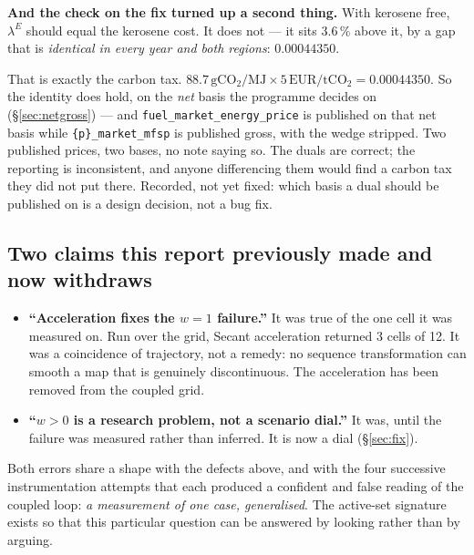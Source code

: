 \documentclass[11pt,a4paper]{article}
\newcommand{\var}[1]{\texttt{\small #1}}
\begin{document}
\begin{keybox}
\textbf{And the check on the fix turned up a second thing.} With kerosene free,
$\lambda^{E}$ should equal the kerosene cost. It does not --- it sits $3.6\,\%$ above it,
by a gap that is \emph{identical in every year and both regions}: $0.00044350$.

That is exactly the carbon tax. $88.7\,\mathrm{gCO_2/MJ} \times 5\,\mathrm{EUR/tCO_2} =
0.00044350$. So the identity does hold, on the \emph{net} basis the programme decides on
(\S\ref{sec:netgross}) --- and \var{fuel\_market\_energy\_price} is published on that net
basis while \var{\{p\}\_market\_mfsp} is published gross, with the wedge stripped. Two
published prices, two bases, no note saying so. The duals are correct; the reporting is
inconsistent, and anyone differencing them would find a carbon tax they did not put
there. Recorded, not yet fixed: which basis a dual should be published on is a design
decision, not a bug fix.
\end{keybox}

\subsection*{Two claims this report previously made and now withdraws}

\begin{itemize}[leftmargin=*]
  \item \textbf{``Acceleration fixes the \(w=1\) failure.''} It was true of the one cell
        it was measured on. Run over the grid, Secant acceleration returned 3 cells of
        12. It was a coincidence of trajectory, not a remedy: no sequence transformation
        can smooth a map that is genuinely discontinuous. The acceleration has been
        removed from the coupled grid.
  \item \textbf{``\(w>0\) is a research problem, not a scenario dial.''} It was, until
        the failure was measured rather than inferred. It is now a dial
        (\S\ref{sec:fix}).
\end{itemize}

\noindent Both errors share a shape with the defects above, and with the four successive
instrumentation attempts that each produced a confident and false reading of the coupled
loop: \emph{a measurement of one case, generalised}. The active-set signature exists so
that this particular question can be answered by looking rather than by arguing.
\end{document}
